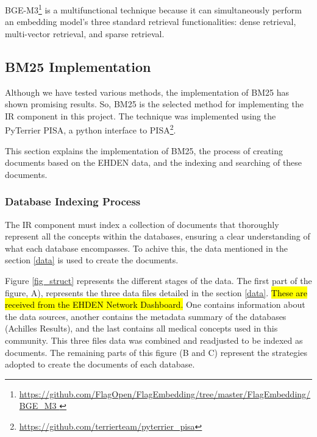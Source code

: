 BGE-M3\footnote{\url{https://github.com/FlagOpen/FlagEmbedding/tree/master/FlagEmbedding/BGE_M3 }} is a multifunctional technique because it can simultaneously perform an embedding model's three standard retrieval functionalities: dense retrieval, multi-vector retrieval, and sparse retrieval.



\subsection{BM25 Implementation}
\label{bm25implementation}

Although we have tested various methods, the implementation of BM25 has shown promising results. So, BM25 is the selected method for implementing the IR component in this project. The technique was implemented using the PyTerrier PISA, a python interface to PISA\footnote{\url{https://github.com/terrierteam/pyterrier_pisa}}.

This section explains the implementation of BM25, the process of creating documents based on the EHDEN data, and the indexing and searching of these documents.


\subsubsection{Database Indexing Process}



The IR component must index a collection of documents that thoroughly represent all the concepts within the databases, ensuring a clear understanding of what each database encompasses. To achive this, the data mentioned in the section \ref{data} is used to create the documents.

Figure \ref{fig_struct} represents the different stages of the data. The first part of the figure, A), represents the three data files detailed in the section \ref{data}. \hl{These are received from the EHDEN Network Dashboard.} One contains information about the data sources, another contains the metadata summary of the databases (Achilles Results), and the last contains all medical concepts used in this community. This three files data was combined and readjusted to be indexed as documents. The remaining parts of this figure (B and C) represent the strategies adopted to create the documents of each database.

